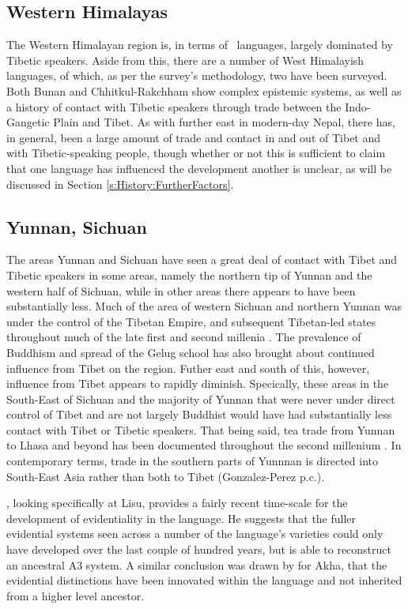 \subsection{Western Himalayas}
The Western Himalayan region is, in terms of \lfam\ languages, largely dominated by Tibetic speakers. Aside from this, there are a number of West Himalayish languages, of which, as per the survey's methodology, two have been surveyed. Both Bunan \cite{Widmer2020} and Chhitkul-Rakchham \cite{Martinez2021} show complex epistemic systems, as well as a history of contact with Tibetic speakers through trade between the Indo-Gangetic Plain and Tibet. As with further east in modern-day Nepal, there has, in general, been a large amount of trade and contact in and out of Tibet and with Tibetic-speaking people, though whether or not this is sufficient to claim that one language has influenced the development another is unclear, as will be discussed in Section \ref{s:History:FurtherFactors}.

\subsection{Yunnan, Sichuan}\label{ss:History:YunSich}
The areas Yunnan and Sichuan have seen a great deal of contact with Tibet and Tibetic speakers in some areas, namely the northern tip of Yunnan and the western half of Sichuan, while in other areas there appears to have been substantially less. Much of the area of western Sichuan and northern Yunnan was under the control of the Tibetan Empire, and subsequent Tibetan-led states throughout much of the late first and second millenia \cite{Schaik2013}. The prevalence of Buddhism and spread of the Gelug school has also brought about continued influence from Tibet on the region. Futher east and south of this, however, influence from Tibet appears to rapidly diminish. Specically, these areas in the South-East of Sichuan and the majority of Yunnan that were never under direct control of Tibet and are not largely Buddhist would have had substantially less contact with Tibet or Tibetic speakers. That being said, tea trade from Yunnan to Lhasa and beyond has been documented throughout the second millenium \cite{Sigley2020}. In contemporary terms, trade in the southern parts of Yunnnan is directed into South-East Asia rather than both to Tibet (Gonzalez-Perez p.c.).

, looking specifically at Lisu, provides a fairly recent time-scale for the development of evidentiality in the language. He suggests that the fuller evidential systems seen across a number of the language's varieties could only have developed over the last couple of hundred years, but is able to reconstruct an ancestral A3 system. A similar conclusion was drawn by  for Akha, that the evidential distinctions have been innovated within the language and not inherited from a higher level ancestor.

